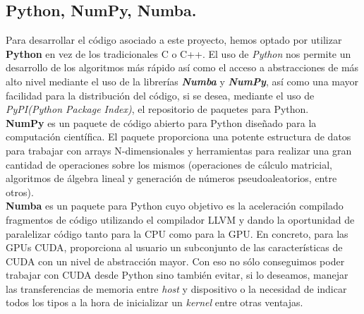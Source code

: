 \subsection{Python, NumPy, Numba.}
Para desarrollar el código asociado a este proyecto, hemos optado por utilizar \textbf{Python} en vez de los tradicionales C o C++. El uso de \textit{Python} nos permite un desarrollo de los algoritmos más rápido así como el acceso a abstracciones de más alto nivel mediante el uso de la librerías \textbf{\textit{Numba}} y \textbf{\textit{NumPy}},  así como una mayor facilidad para la distribución del código, si se desea, mediante el uso de \textit{PyPI(Python Package Index)}, el repositorio de paquetes para Python. \\

\textbf{NumPy} \cite{numpy} es un paquete de código abierto para Python diseñado para la computación científica. El paquete proporciona una potente estructura de datos para trabajar con arrays N-dimensionales y herramientas para realizar una gran cantidad de operaciones sobre los mismos (operaciones de cálculo matricial, algoritmos de álgebra lineal y generación de números pseudoaleatorios, entre otros).\\

\textbf{Numba} \cite{numba} es un paquete para Python cuyo objetivo es la aceleración compilado fragmentos de código utilizando el compilador LLVM y dando la oportunidad de paralelizar código tanto para la CPU como para la GPU. En concreto, para las GPUs CUDA, proporciona al usuario un subconjunto de las características de CUDA con un nivel de abstracción mayor. Con eso no sólo conseguimos poder trabajar con CUDA desde Python sino también evitar, si lo deseamos, manejar las transferencias de memoria entre \textit{host} y dispositivo o la necesidad de indicar todos los tipos a la hora de inicializar un \textit{kernel} entre otras ventajas.\\

